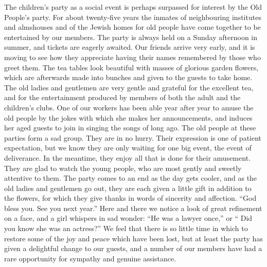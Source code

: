 The children’s party as a social event is perhaps
surpassed for interest by the Old People’s party. For about
twenty-five years the inmates of neighbouring institutes
and almshouses and of the Jewish homes for old people
have come together to be entertained by our members.
The party is always held on a Sunday afternoon in
summer, and tickets are eagerly awaited. Our friends
arrive very early, and it is moving to see how they
appreciate having their names remembered by those who greet
them. The tea tables look beautiful with masses of
glorious garden flowers, which are afterwards made into
bunches and given to the guests to take home. The old
ladies and gentlemen are very gentle and grateful for
the excellent tea, and for the entertainment produced by
members of both the adult and the children’s clubs. One
of our workers has been able year after year to amuse
the old people by the jokes with which she makes her
announcements, and induces her aged guests to join in
singing the songs of long ago. The old people at these
parties form a sad group. They are in no hurry. Their
expression is one of patient expectation, but we know they
are only waiting for one big event, the event of
deliverance. In the meantime, they enjoy all that is done for
their amusement. They are glad to watch the young
people, who are most gently and sweetly attentive to
them. The party comes to an end as the day gets cooler,
and as the old ladies and gentlemen go out, they are each
given a little gift in addition to the flowers, for which they
give thanks in words of sincerity and affection. “God
bless you. See you next year.” Here and there we notice
a look of great refinement on a face, and a girl whispers
in sad wonder: “He was a lawyer once,” or “ Did you
know she was an actress?” We feel that there is so little
time in which to restore some of the joy and peace which
have been lost, but at least the party has given a delightful
change to our guests, and a number of our members
have had a rare opportunity for sympathy and genuine
assistance.


